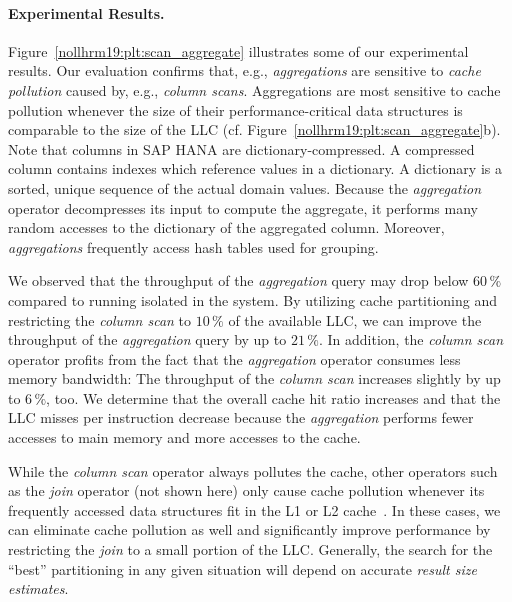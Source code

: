 \documentclass[11pt,dvipdfm]{article}
\begin{document}
\paragraph*{Experimental Results.}
Figure~\ref{nollhrm19:plt:scan_aggregate} illustrates some of our experimental results.
Our evaluation confirms that, e.g., \emph{aggregations} are sensitive to \emph{cache pollution} caused by, e.g., \emph{column scans}.
Aggregations are most sensitive to cache pollution whenever the size of their performance-critical data structures is comparable to the size of the LLC (cf. Figure~\ref{nollhrm19:plt:scan_aggregate}b).
Note that columns in SAP HANA are dictionary-compressed.
A compressed column contains indexes which reference values in a dictionary.
A dictionary is a sorted, unique sequence of the actual domain values.
Because the \emph{aggregation} operator decompresses its input to compute the aggregate, it performs many random accesses to the dictionary of the aggregated column.
Moreover, \emph{aggregations} frequently access hash tables used for grouping.

We observed that the throughput of the \emph{aggregation} query may drop below $60\,\mathrm{\%}$ compared to running isolated in the system.
By utilizing cache partitioning and restricting the \emph{column scan} to $10\,\mathrm{\%}$ of the available LLC, we can improve the throughput of the \emph{aggregation} query by up to $21\,\mathrm{\%}$.
In addition, the \emph{column scan} operator profits from the fact that the \emph{aggregation} operator consumes less memory bandwidth:
The throughput of the \emph{column scan} increases slightly by up to $6\,\mathrm{\%}$, too.
We determine that the overall cache hit ratio increases and that the LLC misses per instruction decrease because the \emph{aggregation} performs fewer accesses to main memory and more accesses to the cache.

While the \emph{column scan} operator always pollutes the cache, other operators such as the \emph{join} operator (not shown here) only cause cache pollution whenever its frequently accessed data structures fit in the L1 or L2 cache~\cite{nollhrm19:Noll:2018}.
In these cases, we can eliminate cache pollution as well and significantly improve performance by restricting the \emph{join} to a small portion of the LLC.
Generally, the search for the ``best'' partitioning in any given situation will depend on accurate \emph{result size estimates}.
\end{document}
